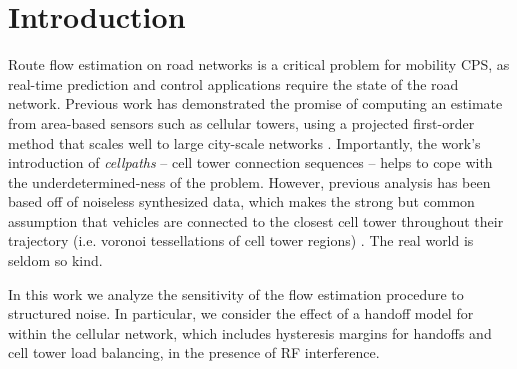
\section{Introduction}
Route flow estimation on road networks is a critical problem for mobility CPS, as real-time prediction and control applications require the state of the road network. Previous work has demonstrated the promise of computing an estimate from area-based sensors such as cellular towers, using a projected first-order method that scales well to large city-scale networks \cite{Wu2015}. Importantly, the work's introduction of \textit{cellpaths} -- cell tower connection sequences -- helps to cope with the underdetermined-ness of the problem. However, previous analysis has been based off of noiseless synthesized data, which makes the strong but common assumption that vehicles are connected to the closest cell tower throughout their trajectory (i.e. voronoi tessellations of cell tower regions) \cite{Voronoi1908}. The real world is seldom so kind.

In this work we analyze the sensitivity of the flow estimation procedure to structured noise. In particular, we consider the effect of a handoff model for within the cellular network, which includes hysteresis margins for handoffs and cell tower load balancing, in the presence of RF interference.
